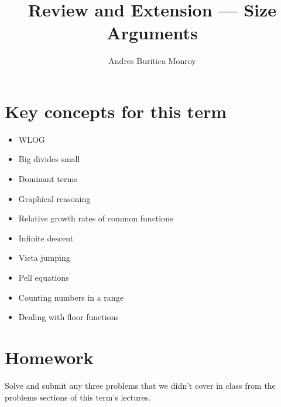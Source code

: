 \documentclass{article}
\title{Review and Extension --- Size Arguments}
\author{Andres Buritica Monroy}
\date{}
\begin{document}
\maketitle
\section{Key concepts for this term}
\begin{itemize}
	\item WLOG
	\item Big divides small
	\item Dominant terms
	\item Graphical reasoning
	\item Relative growth rates of common functions
	\item Infinite descent
	\item Vieta jumping
	\item Pell equations
	\item Counting numbers in a range
	\item Dealing with floor functions
\end{itemize}
\section{Homework}
Solve and submit any three problems that we didn't cover in class
from the problems sections of this term's lectures.
\newpage
\end{document}
